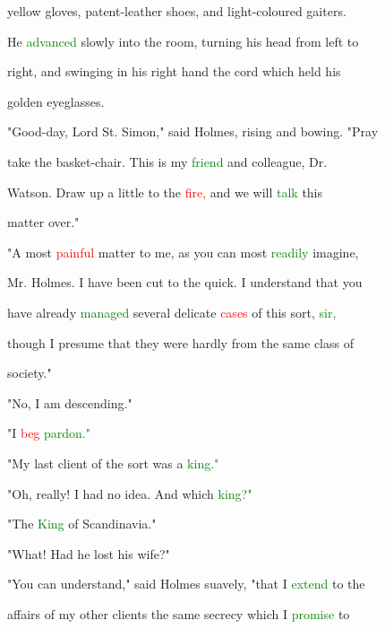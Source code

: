  yellow gloves, patent-leather shoes, and light-coloured gaiters.

 He \textcolor{green}{advanced} slowly into the room, turning his head from left to

 right, and swinging in his right hand the cord which held his

 golden eyeglasses.



 "Good-day, \textcolor{BurntOrange}{Lord} St. Simon," said Holmes, rising and bowing. \textcolor{BurntOrange}{"Pray}

 take the basket-chair. This is my \textcolor{green}{friend} and colleague, Dr.

 Watson. Draw up a little to the \textcolor{red}{fire,} and we will \textcolor{green}{talk} this

 matter over."



 "A most \textcolor{red}{painful} matter to me, as you can most \textcolor{green}{readily} imagine,

 Mr. Holmes. I have been cut to the quick. I understand that you

 have already \textcolor{green}{managed} several delicate \textcolor{red}{cases} of this sort, \textcolor{green}{sir,}

 though I presume that they were hardly from the same class of

 society."



 "No, I am descending."



 "I \textcolor{red}{beg} \textcolor{green}{pardon."}



 "My last client of the sort was a \textcolor{green}{king."}



 "Oh, really! I had no idea. And which \textcolor{green}{king?"}



 "The \textcolor{green}{King} of Scandinavia."



 "What! Had he \textcolor{BurntOrange}{lost} his wife?"



 "You can understand," said Holmes suavely, "that I \textcolor{green}{extend} to the

 affairs of my other clients the same \textcolor{BurntOrange}{secrecy} which I \textcolor{green}{promise} to

